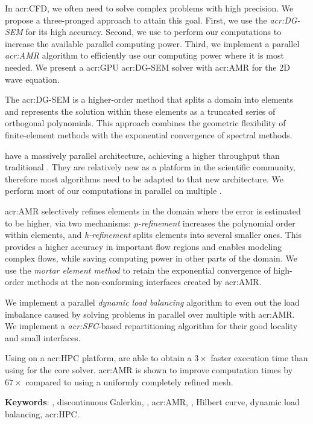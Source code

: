 \begin{adjustwidth}{-0.5in}{-0.5in}

\hspace{\parindent} %
In \acrfull{acr:CFD}, we often need to solve complex problems with high precision. We propose
a three-pronged approach to attain this goal. First, we use the \textit{\acrfull{acr:DG-SEM}} for
its high accuracy. Second, we use \textit{} to perform our computations to
increase the available parallel computing power. Third, we implement a parallel
\textit{\acrfull{acr:AMR}} algorithm to efficiently use our computing power where it is most needed.
We present a \acrshort{acr:GPU} \acrshort{acr:DG-SEM} solver with \acrshort{acr:AMR} for the 2D wave
equation. 

The \acrshort{acr:DG-SEM} is a higher-order method that splits a domain into elements and represents
the solution within these elements as a truncated series of orthogonal polynomials. This approach
combines the geometric flexibility of finite-element methods with the exponential convergence of
spectral methods.

 have a massively parallel architecture, achieving a higher throughput than
traditional . They are relatively new as a platform in the scientific community,
therefore most algorithms need to be adapted to that new architecture. We perform most of our
computations in parallel on multiple .

\Acrshort{acr:AMR} selectively refines elements in the domain where the error is estimated to be
higher, via two mechanisms: \textit{p-refinement} increases the polynomial order within elements,
and \textit{h-refinement} splits elements into several smaller ones. This provides a higher accuracy
in important flow regions and enables modeling complex flows, while saving computing power in other
parts of the domain. We use the \textit{mortar element method} to retain the exponential convergence
of high-order methods at the non-conforming interfaces created by \acrshort{acr:AMR}.

We implement a parallel \textit{dynamic load balancing} algorithm to even out the load imbalance
caused by solving problems in parallel over multiple  with \acrshort{acr:AMR}.
We implement a \textit{\acrfull{acr:SFC}}-based repartitioning algorithm for their good locality and
small interfaces.

Using  on a \acrshort{acr:HPC} platform, are able to obtain a \(3 \times \)
faster execution time than using  for the core solver. \Acrshort{acr:AMR} is
shown to improve computation times by \(67 \times \) compared to using a uniformly completely
refined mesh.

\noindent
\textbf{Keywords}: , discontinuous Galerkin, , \acrlong{acr:AMR}, , Hilbert curve, dynamic load balancing, \acrlong{acr:HPC}.

\end{adjustwidth}
